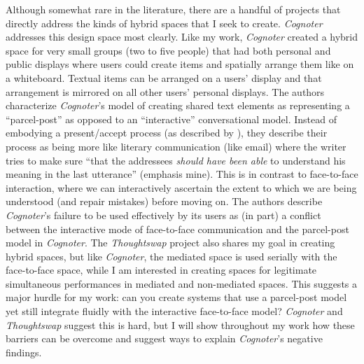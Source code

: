 \documentclass{tufte-handout}
\begin{document}
Although somewhat rare in the literature, there are a handful of projects that directly address the kinds of hybrid spaces that I seek to create. \emph{Cognoter} \citep{Tatar:1991jq} addresses this design space most clearly. Like my work, \emph{Cognoter} created a hybrid space for very small groups (two to five people) that had both personal and public displays where users could create items and spatially arrange them like on a whiteboard. Textual items can be arranged on a users' display and that arrangement is mirrored on all other users' personal displays. The authors characterize \emph{Cognoter}'s model of creating shared text elements as representing a ``parcel-post'' as opposed to an ``interactive'' conversational model. Instead of embodying a present/accept process (as described by \citep{Clark:1989uc}), they describe their process as being more like literary communication (like email) where the writer tries to make sure ``that the addressees \emph{should have been able} to understand his meaning in the last utterance'' (emphasis mine). This is in contrast to face-to-face interaction, where we can interactively ascertain the extent to which we are being understood (and repair mistakes) before moving on. The authors describe \emph{Cognoter}'s failure to be used effectively by its users as (in part) a conflict between the interactive mode of face-to-face communication and the parcel-post model in \emph{Cognoter}. The \emph{Thoughtswap} project \cite{DickeyKurdziolek:2010wt} also shares my goal in creating hybrid spaces, but like \emph{Cognoter}, the mediated space is used serially with the face-to-face space, while I am interested in creating spaces for legitimate simultaneous performances in mediated and non-mediated spaces. This suggests a major hurdle for my work: can you create systems that use a parcel-post model yet still integrate fluidly with the interactive face-to-face model? \emph{Cognoter} and \emph{Thoughtswap} suggest this is hard, but I will show throughout my work how these barriers can be overcome and suggest ways to explain \emph{Cognoter}'s negative findings.


\end{document}
